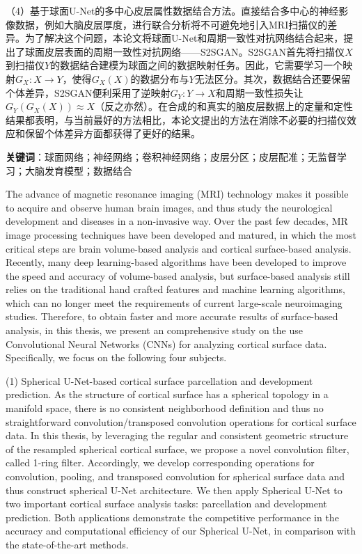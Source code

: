 （4）基于球面U-Net的多中心皮层属性数据结合方法。直接结合多中心的神经影像数据，例如大脑皮层厚度，进行联合分析将不可避免地引入MRI扫描仪的差异。为了解决这个问题，本论文将球面U-Net和周期一致性对抗网络结合起来，提出了球面皮层表面的周期一致性对抗网络——S2SGAN。S2SGAN首先将扫描仪$X$到扫描仪$Y$的数据结合建模为球面之间的数据映射任务。因此，它需要学习一个映射$G_X:X\rightarrow Y$，使得$G_X(X)$的数据分布与$Y$无法区分。其次，数据结合还要保留个体差异，S2SGAN便利采用了逆映射$G_Y:Y\rightarrow X$和周期一致性损失让$G_Y(G_X(X))\approx X$（反之亦然）。在合成的和真实的脑皮层数据上的定量和定性结果都表明，与当前最好的方法相比，本论文提出的方法在消除不必要的扫描仪效应和保留个体差异方面都获得了更好的结果。



\textbf{关键词}：球面网络；神经网络；卷积神经网络；皮层分区；皮层配准；无监督学习；大脑发育模型；数据结合






\cleardoublepage
{}
The advance of magnetic resonance imaging (MRI) technology makes it possible to acquire and observe human brain images, and thus study the neurological development and diseases in a non-invasive way. Over the past few decades, MR image processing techniques have been developed and matured, in which the most critical steps are brain volume-based analysis and cortical surface-based analysis. Recently, many deep learning-based algorithms have been developed to improve the speed and accuracy of volume-based analysis, but surface-based analysis still relies on the traditional hand crafted features and machine learning algorithms, which can no longer meet the requirements of current large-scale neuroimaging studies. Therefore, to obtain faster and more accurate results of surface-based analysis, in this thesis, we present an comprehensive study on the use Convolutional Neural Networks (CNNs) for analyzing cortical surface data. Specifically, we focus on the following four subjects.

(1) Spherical U-Net-based cortical surface parcellation and development prediction. As the structure of cortical surface has a spherical topology in a manifold space, there is no consistent neighborhood definition and thus no straightforward convolution/transposed convolution operations for cortical surface data. In this thesis, by leveraging the regular and consistent geometric structure of the resampled spherical cortical surface, we propose a novel convolution filter, called 1-ring filter. Accordingly, we develop corresponding operations for convolution, pooling, and transposed convolution for spherical surface data and thus construct spherical U-Net architecture. We then apply Spherical U-Net to two important cortical surface analysis tasks: parcellation and development prediction. Both applications demonstrate the competitive performance in the accuracy and computational efficiency of our Spherical U-Net, in comparison with the state-of-the-art methods.
 
